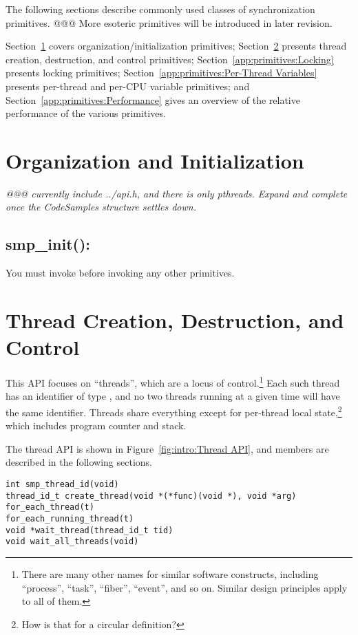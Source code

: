 The following sections describe commonly used classes of synchronization
primitives.
@@@ More esoteric primitives will be introduced in later revision.

Section~\ref{app:primitives:Organization and Initialization}
covers organization/initialization primitives;
Section~\ref{app:primitives:Thread Creation, Destruction, and Control}
presents thread creation, destruction, and control primitives;
Section~\ref{app:primitives:Locking}
presents locking primitives;
Section~\ref{app:primitives:Per-Thread Variables}
presents per-thread and per-CPU variable primitives; and
Section~\ref{app:primitives:Performance}
gives an overview of the relative performance of the various primitives.

\section{Organization and Initialization}
\label{app:primitives:Organization and Initialization}

\emph{@@@ currently include ../api.h, and there is only pthreads.
Expand and complete once the CodeSamples structure settles down.}

\subsection{smp\_init():}
You must invoke  before invoking any other primitives.

\section{Thread Creation, Destruction, and Control}
\label{app:primitives:Thread Creation, Destruction, and Control}

This API focuses on ``threads'', which are a locus of control.\footnote{
	There are many other names for similar software constructs, including
	``process'', ``task'', ``fiber'', ``event'', and so on.
	Similar design principles apply to all of them.}
Each such thread has an identifier of type ,
and no two threads running at a given time will have the same
identifier.
Threads share everything except for per-thread local state,\footnote{
	How is that for a circular definition?}
which includes program counter and stack.

The thread API is shown in
Figure~\ref{fig:intro:Thread API}, and members are described in the
following sections.

\begin{figure*}[htbp]
{ \scriptsize
\begin{verbatim}
int smp_thread_id(void)
thread_id_t create_thread(void *(*func)(void *), void *arg)
for_each_thread(t)
for_each_running_thread(t)
void *wait_thread(thread_id_t tid)
void wait_all_threads(void)
\end{verbatim}
}
\caption{Thread API}
\label{fig:intro:Thread API}
\end{figure*}

